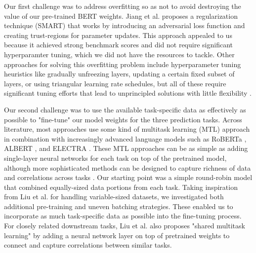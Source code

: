\documentclass{article}
\begin{document}
Our first challenge was to address overfitting so as not to avoid destroying the value of our pre-trained BERT weights. Jiang et al. \cite{smart} proposes a regularization technique (SMART) that works by introducing an adversarial loss function and creating trust-regions for parameter updates. This approach appealed to us because it achieved strong benchmark scores and did not require significant hyperparamter tuning, which we did not have the resources to tackle. Other approaches for solving this overfitting problem include hyperparameter tuning heuristics like gradually unfreezing layers, updating a certain fixed subset of layers, or using triangular learning rate schedules, but all of these require significant tuning efforts that lead to unprincipled solutions with little flexibility \cite{triangle}. 

Our second challenge was to use the available task-specific data as effectively as possible to "fine-tune" our model weights for the three prediction tasks. Across literature, most approaches use some kind of multitask learning (MTL) approach in combination with increasingly advanced language models such as RoBERTa \cite{heinsen2022algorithm}, ALBERT \cite{lan2019albert}, and ELECTRA \cite{clark2020electra}. These MTL approaches can be as simple as adding single-layer neural networks for each task on top of the pretrained model, although more sophisticated methods can be designed to capture richness of data and correlations across tasks \cite{dong2015multi}. Our starting point was a simple round-robin model that combined equally-sized data portions from each task. Taking inspiration from Liu et al. \cite{MTL} \cite{MTDNN} for handling variable-sized datasets, we investigated both additional pre-training and uneven batching strategies. These enabled us to incorporate as much task-specific data as possible into the fine-tuning process. For closely related downstream tasks, Liu et al. \cite{MTL} also proposes "shared multitask learning" by adding a neural network layer on top of pretrained weights to connect and capture correlations between similar tasks.  
\end{document}
